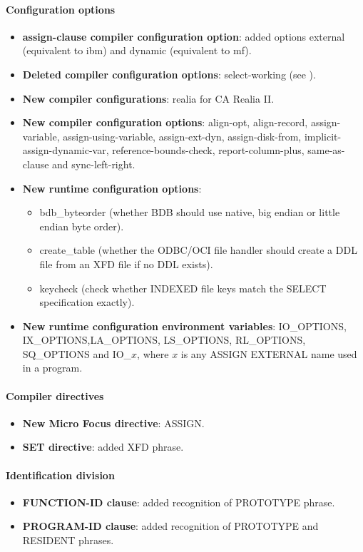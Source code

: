 \paragraph{Configuration options}
\begin{itemize}
\item \textbf{assign-clause compiler configuration option}: added options external (equivalent to ibm) and dynamic (equivalent to mf).
\item \textbf{Deleted compiler configuration options}: select-working (see ).
\item \textbf{New compiler configurations}: realia for CA Realia II.
\item \textbf{New compiler configuration options}: align-opt, align-record, assign-variable, assign-using-variable, assign-ext-dyn, assign-disk-from, implicit-assign-dynamic-var, reference-bounds-check, report-column-plus, same-as-clause and sync-left-right.
\item \textbf{New runtime configuration options}:
  \begin{itemize}
  \item bdb\_byteorder (whether BDB should use native, big endian or little endian byte order).
  \item create\_table (whether the ODBC\slash{}OCI file handler should create a DDL file from an XFD file if no DDL exists).
  \item keycheck (check whether INDEXED file keys match the SELECT specification exactly).
  \end{itemize}
\item \textbf{New runtime configuration environment variables}: IO\_OPTIONS, IX\_OPTIONS,\linebreak LA\_OPTIONS, LS\_OPTIONS, RL\_OPTIONS, SQ\_OPTIONS and IO\_$x$, where $x$ is any ASSIGN EXTERNAL name used in a program.
\end{itemize}

\paragraph{Compiler directives}
\begin{itemize}
\item \textbf{New Micro Focus directive}: ASSIGN.
\item \textbf{\directiveindicator{}SET directive}: added XFD phrase.
\end{itemize}

\paragraph{Identification division}
\begin{itemize}
\item \textbf{FUNCTION-ID clause}: added recognition of PROTOTYPE phrase.
\item \textbf{PROGRAM-ID clause}: added recognition of PROTOTYPE and RESIDENT phrases.
\end{itemize}

